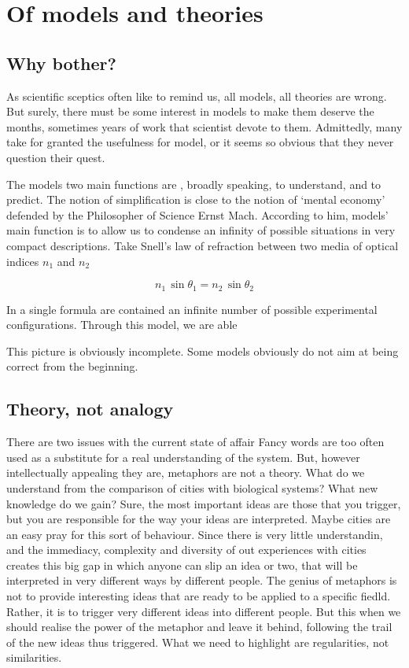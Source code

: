 \section{Of models and theories}

\subsection{Why bother?}
\label{sub:why_bother_}

As scientific sceptics often like to remind us, all models, all theories are
wrong. But surely, there must be some interest in models to make them deserve
the months, sometimes years of work that scientist devote to them. Admittedly,
many take for granted the usefulness for model, or it seems so obvious that they
never question their quest.

The models two main functions are , broadly speaking, to understand, and to
predict.  The notion of simplification is close to the notion of `mental
economy' defended by the Philosopher of Science Ernst Mach.  According to him,
models' main function is to allow us to condense an infinity of possible
situations in very compact descriptions. Take Snell's law of refraction between
two media of optical indices $n_1$ and $n_2$

\begin{equation}
    n_1\,\sin \theta_1 = n_2\,\sin \theta_2
\end{equation}

In a single formula are contained an infinite number of possible experimental
configurations. Through this model, we are able

This picture is obviously incomplete. Some models obviously do not aim at being
correct from the beginning.

\subsection{Theory, not analogy}
\label{sub:theory_not_analogy}




There are two issues with the current state of affair 
Fancy words are too often used as a substitute for a real
understanding of the system. But, however intellectually appealing they are,
metaphors are not a theory. What do we understand from the comparison of cities
with biological systems? What new knowledge do we gain? Sure, the most important
ideas are those that you trigger, but you are responsible for the way your ideas
are interpreted.  Maybe cities are an easy pray for this sort of behaviour.
Since there is very little understandin, and the immediacy, complexity and
diversity of out experiences with cities creates this big gap in which anyone
can slip an idea or two, that will be interpreted in very different ways by
different people. The genius of metaphors is not to provide interesting ideas
that are ready to be applied to a specific fiedld. Rather, it is to trigger very
different ideas into different people. But this when we should realise the power
of the metaphor and leave it behind, following the trail of the new ideas thus
triggered. What we need to highlight are regularities, not similarities.

